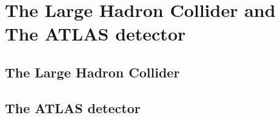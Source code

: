 \chapter{The Large Hadron Collider and The ATLAS detector}
\section{The Large Hadron Collider}
\section{The ATLAS detector}

